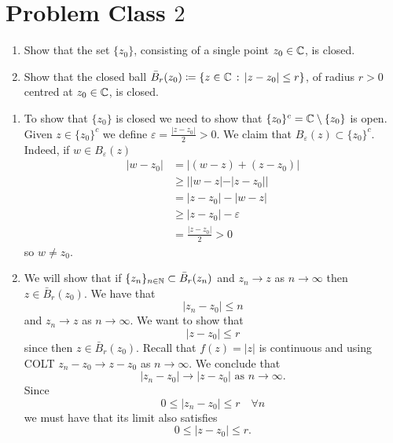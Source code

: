 \documentclass[10pt, a4paper]{article}
\begin{document}
\newpage

\section{Problem Class \texorpdfstring{$2$}{}}

\begin{problem}\phantom{}
    \begin{enumerate}[label = (\roman*)]
        \item Show that the set $\{z_0\}$,
        consisting of a single point $z_0 \in \mathbb{C}$,
        is closed.

        \item Show that the closed ball $\bar{B}_{r}(z_0) \coloneqq \{z \in \mathbb{C}\,:\,|z - z_0| \leq r\}$,
        of radius $r > 0$ centred at $z_0 \in \mathbb{C}$,
        is closed.
    \end{enumerate}

    \begin{solution}
        \begin{enumerate}[label = (\roman*)]
            \item To show that $\{z_0\}$ is closed we need to show that $\{z_0\} ^ c = \mathbb{C} \setminus \{z_0\}$ is open.
            Given $z \in \{z_0\} ^ c$ we define $\varepsilon = \frac{|z - z_0|}{2} > 0$.
            We claim that $B_{\varepsilon}(z) \subset \{z_0\} ^ c$.
            Indeed,
            if $w \in B_{\varepsilon}(z)$
            \begin{align*}
                |w - z_0| &= |(w - z) + (z - z_0)| \\
                &\geq ||w - z| - |z - z_0|| \\
                &= |z - z_0| - |w - z| \\
                &\geq |z - z_0| - \varepsilon \\
                &= \frac{|z - z_0|}{2} > 0
            \end{align*}
            so $w \neq z_0$.

            \item We will show that if $\{z_{n}\}_{n \in \mathbb{N}} \subset \bar{B}_r(z_n)$ and $z_n \to z$ as $n \to \infty$ then $z \in \bar{B}_r(z_0)$.
            We have that
            \[
            |z_n - z_0| \leq n
            \]
            and $z_n \to z$ as $n \to \infty$.
            We want to show that
            \[
            |z - z_0| \leq r
            \]
            since then $z \in \bar{B}_r(z_0)$.
            Recall that $f(z) = |z|$ is continuous and using COLT $z_n - z_0 \to z - z_0$ as $n \to \infty$.
            We conclude that
            \[
            |z_n - z_0| \to |z - z_0| \text{ as } n \to \infty.
            \]
            Since
            \[
            0 \leq |z_n - z_0| \leq r\quad \forall n
            \]
            we must have that its limit also satisfies
            \[
            0 \leq |z - z_0| \leq r.
            \]
        \end{enumerate}
    \end{solution}
\end{problem}
\end{document}
